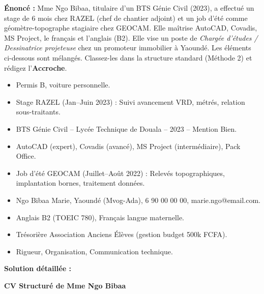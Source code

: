 \documentclass[11pt]{article}
\begin{document}
\begin{exoresolu}
\textbf{Énoncé :} Mme Ngo Bibaa, titulaire d'un BTS Génie Civil (2023), a effectué un stage de 6 mois chez RAZEL (chef de chantier adjoint) et un job d'été comme géomètre-topographe stagiaire chez GEOCAM. Elle maîtrise AutoCAD, Covadis, MS Project, le français et l'anglais (B2). Elle vise un poste de \emph{Chargée d'études / Dessinatrice projeteuse} chez un promoteur immobilier à Yaoundé. Les éléments ci-dessous sont mélangés. Classez-les dans la structure standard (Méthode 2) et rédigez l'\textbf{Accroche}.

\begin{itemize}
    \item Permis B, voiture personnelle.
    \item Stage RAZEL (Jan--Juin 2023) : Suivi avancement VRD, métrés, relation sous-traitants.
    \item BTS Génie Civil -- Lycée Technique de Douala -- 2023 -- Mention Bien.
    \item AutoCAD (expert), Covadis (avancé), MS Project (intermédiaire), Pack Office.
    \item Job d'été GEOCAM (Juillet--Août 2022) : Relevés topographiques, implantation bornes, traitement données.
    \item Ngo Bibaa Marie, Yaoundé (Mvog-Ada), 6 90 00 00 00, marie.ngo@email.com.
    \item Anglais B2 (TOEIC 780), Français langue maternelle.
    \item Trésorière Association Anciens Élèves (gestion budget 500k FCFA).
    \item Rigueur, Organisation, Communication technique.
\end{itemize}

\tcblower
\textbf{Solution détaillée :}

\textbf{CV Structuré de Mme Ngo Bibaa}


\end{exoresolu}
\end{document}
